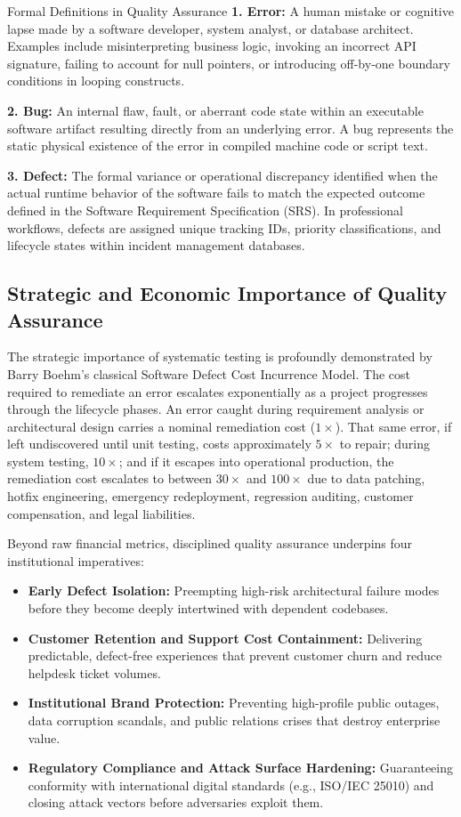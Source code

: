 \documentclass[11pt,a4paper]{article}
\begin{document}
\begin{conceptcard}{Formal Definitions in Quality Assurance}
\textbf{1. Error:} A human mistake or cognitive lapse made by a software developer, system analyst, or database architect. Examples include misinterpreting business logic, invoking an incorrect API signature, failing to account for null pointers, or introducing off-by-one boundary conditions in looping constructs.

\textbf{2. Bug:} An internal flaw, fault, or aberrant code state within an executable software artifact resulting directly from an underlying error. A bug represents the static physical existence of the error in compiled machine code or script text.

\textbf{3. Defect:} The formal variance or operational discrepancy identified when the actual runtime behavior of the software fails to match the expected outcome defined in the Software Requirement Specification (SRS). In professional workflows, defects are assigned unique tracking IDs, priority classifications, and lifecycle states within incident management databases.
\end{conceptcard}

\subsection{Strategic and Economic Importance of Quality Assurance}
The strategic importance of systematic testing is profoundly demonstrated by Barry Boehm's classical Software Defect Cost Incurrence Model. The cost required to remediate an error escalates exponentially as a project progresses through the lifecycle phases. An error caught during requirement analysis or architectural design carries a nominal remediation cost ($1\times$). That same error, if left undiscovered until unit testing, costs approximately $5\times$ to repair; during system testing, $10\times$; and if it escapes into operational production, the remediation cost escalates to between $30\times$ and $100\times$ due to data patching, hotfix engineering, emergency redeployment, regression auditing, customer compensation, and legal liabilities.

Beyond raw financial metrics, disciplined quality assurance underpins four institutional imperatives:
\begin{itemize}
    \item \textbf{Early Defect Isolation:} Preempting high-risk architectural failure modes before they become deeply intertwined with dependent codebases.
    \item \textbf{Customer Retention and Support Cost Containment:} Delivering predictable, defect-free experiences that prevent customer churn and reduce helpdesk ticket volumes.
    \item \textbf{Institutional Brand Protection:} Preventing high-profile public outages, data corruption scandals, and public relations crises that destroy enterprise value.
    \item \textbf{Regulatory Compliance and Attack Surface Hardening:} Guaranteeing conformity with international digital standards (e.g., ISO/IEC 25010) and closing attack vectors before adversaries exploit them.
\end{itemize}
\end{document}
